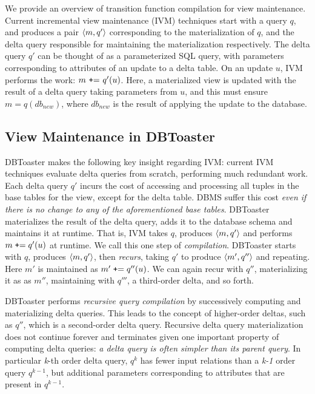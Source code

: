 We provide an overview of transition function compilation for view maintenance.
Current incremental view maintenance (IVM) techniques start with a query $q$,
and produces a pair ${\langle m,q'\rangle}$ corresponding to the materialization of $q$,
and the delta query responsible for maintaining the materialization
respectively. The delta query $q'$ can be thought of as a parameterized SQL
query, with parameters corresponding to attributes of an update to a delta
table. On an update $u$, IVM performs the work: $m \mbox{ {\tt+}= } q'(u)$.
Here, a materialized view is updated with the result of a delta query taking
parameters from $u$, and this must ensure $m = q(db_{new})$, where $db_{new}$ is
the result of applying the update to the database.

\subsection{View Maintenance in DBToaster}
DBToaster makes the following key insight regarding IVM: current IVM techniques
evaluate delta queries from scratch, performing much redundant work. Each delta
query $q'$ incurs the cost of accessing and processing all tuples in the base
tables for the view, except for the delta table. DBMS suffer this cost
\textit{even if there is no change to any of the aforementioned base tables}.
DBToaster materializes the result of the delta query, adds it to the database
schema and maintains it at runtime.
That is, IVM takes $q$, produces ${\langle m,q'\rangle}$ and performs
$m \; \mbox{{\tt +}=} \; q'(u)$ at runtime. We call this one step of
\textit{compilation}. DBToaster starts with $q$, produces
${\langle m,q'\rangle}$, then \textit{recurs}, taking $q'$ to produce ${\langle m', q''\rangle}$
and repeating. Here $m'$ is maintained as $m' \; \mbox{{\tt +}=} \; q''(u)$.
We can again recur with $q''$, materializing it as as $m''$, maintaining with
$q'''$, a third-order delta, and so forth.

DBToaster performs \textit{recursive query compilation} by successively
computing and materializing delta queries. This leads to the concept of
higher-order deltas, such as $q''$, which is a second-order delta query.
Recursive delta query materialization does not continue forever and terminates
given one important property of computing delta queries: \textit{a delta query
is often simpler than its parent query}. In particular \textit{k}-th order delta
query, $q^k$ has fewer input relations than a \textit{k-1} order query
$q^{k-1}$, but additional parameters corresponding to attributes that are
present in $q^{k-1}$.

